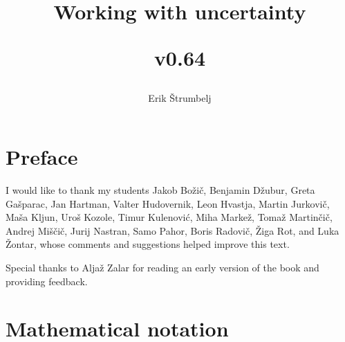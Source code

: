 \documentclass{book}
\title{\textbf{Working with uncertainty}\\ \begin{small}v0.64\end{small}}
\author{Erik \v{S}trumbelj}
\theoremstyle{plain}%
\theoremstyle{definition}
\begin{document}
\maketitle

\newpage

\tableofcontents

\chapter*{Preface}

I would like to thank my students Jakob Bo\v{z}i\v{c}, Benjamin Džubur, Greta Ga\v{s}parac, Jan Hartman, Valter Hudovernik, Leon Hvastja, Martin Jurkovi\v{c}, Ma\v{s}a Kljun, Uro\v{s} Kozole, Timur Kulenovi\'{c}, Miha Marke\v{z}, Toma\v{z} Martin\v{c}i\v{c}, Andrej Mi\v{s}\v{c}i\v{c}, Jurij Nastran, Samo Pahor, Boris Radovič, \v{Z}iga Rot, and Luka \v{Z}ontar, whose comments and suggestions helped improve this text.

Special thanks to Alja\v{z} Zalar for reading an early version of the book and providing feedback.


\chapter*{Mathematical notation}
\end{document}
